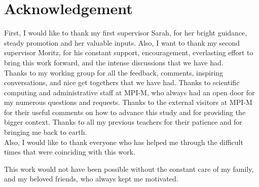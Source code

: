 \section*{Acknowledgement} %

First, I would like to thank my first supervisor Sarah, for her bright guidance, steady promotion and her valuable inputs. Also, I want to thank my second supervisor Moritz, for his constant support, encouragement, everlasting effort to bring this work forward, and the intense discussions that we have had.\\

\noindent
Thanks to my working group for all the feedback, comments, inspiring conversations, and nice get togethers that we have had. Thanks to scientific computing and administrative staff at MPI-M, who always had an open door for my numerous questions and requests. Thanks to the external visitors at MPI-M for their useful comments on how to advance this study and for providing the bigger context. Thanks to all my previous teachers for their patience and for bringing me back to earth. \\

\noindent
Also, I would like to thank everyone who has helped me through the difficult times that were coinciding with this work. \newline

\noindent
This work would not have been possible without the constant care of my family, and my beloved friends, who always kept me motivated.
